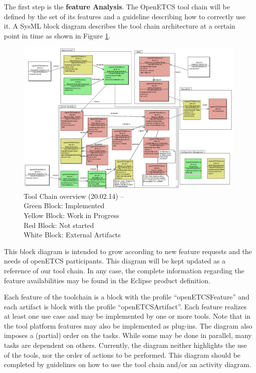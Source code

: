 The first step is the {\bf feature Analysis}.
The OpenETCS tool chain  will be defined by the set of its features and
a guideline describing how to correctly use it.
A SysML block diagram describes the tool chain architecture at a certain point in time as shown in
Figure \ref{fig:overview}. 
\begin{figure}[htbp]
\includegraphics[width=\textwidth]{ToolChainmodel}
\caption{\label{fig:overview} Tool Chain overview (20.02.14) -- \\
  Green Block: Implemented \\
  Yellow Block: Work in Progress \\
  Red Block: Not started \\
  White Block: External Artifacts} 
\end{figure}
This block diagram is intended to grow according to new feature requests and the
needs of openETCS participants.  This diagram will be kept updated
as a reference of our tool chain. In any case, the complete information
regarding the feature availabilities  may be found in the Eclipse product
definition.

Each feature of the toolchain is a block with the profile ``openETCSFeature''
and  each artifact is block with the profile ``openETCSArtifact''.  Each
feature realizes at least one use case and may be implemented by one or more tools.
Note that in the tool platform features  may also be
implemented as plug-ins. The diagram also imposes a (partial) order
on the tasks. While some may be done in parallel, many tasks are dependent on others.
Currently, the diagram neither highlights the use of the tools, nor the order of actions
to be performed. This diagram should be completed by guidelines on
how to use the tool chain and/or an activity diagram.

